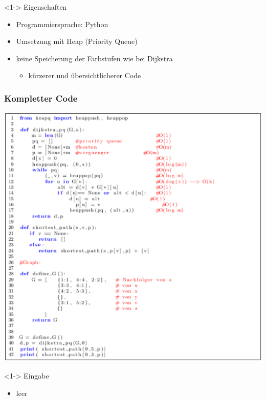 \begin{frame}
	\begin{block} <1-> {Eigenschaften}
		\begin{itemize}
			\item <2-> Programmiersprache: Python
			\item <3-> Umsetzung mit Heap (Priority Queue)
			\item <4-> keine Speicherung der Farbstufen wie bei Dijkstra
				\begin{itemize}
					\item <5-> kürzerer und übersichtlicherer Code
				\end{itemize}
		\end{itemize}
	\end{block}	
\end{frame}


\begin{frame}
\frametitle{Kompletter Code}
	\centering
	\includegraphics[scale=0.3]{./pictures/dikstra_pythonCode.eps}
\end{frame}


\begin{frame}
	\begin{block} <1-> {Eingabe}
		\begin{itemize}
			\item leer
		\end{itemize}
	\end{block}	
\end{frame}


